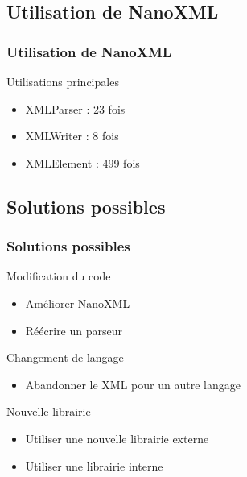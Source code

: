 \subsection{Utilisation de NanoXML}
\begin{frame}\frametitle{Utilisation de NanoXML}
\begin{beamerboxesrounded}[shadow=true]{Utilisations principales}
 \begin{itemize}
  \item XMLParser : 23 fois
  \item XMLWriter : 8 fois
  \item XMLElement : 499 fois
 \end{itemize}
\end{beamerboxesrounded}
\end{frame}
\subsection{Solutions possibles}
\begin{frame}\frametitle{Solutions possibles}
\begin{minipage}[c]{.46\linewidth}
\begin{beamerboxesrounded}[shadow=true]{Modification du code}
\begin{itemize}
	\item Améliorer NanoXML
	\item Réécrire un parseur
\end{itemize}
\end{beamerboxesrounded}
\end{minipage}
\hfill
\begin{minipage}[c]{.46\linewidth}
\begin{beamerboxesrounded}[shadow=true]{Changement de langage}
\begin{itemize}
	\item Abandonner le XML pour un autre langage
\end{itemize}
\end{beamerboxesrounded}
\end{minipage}
\vfill
\hfil
\begin{minipage}[c]{.8\linewidth}
\begin{beamerboxesrounded}[shadow=true]{Nouvelle librairie}
\begin{itemize}
	\item Utiliser une nouvelle librairie externe
	\item Utiliser une librairie interne
\end{itemize}
\end{beamerboxesrounded}
\end{minipage}
\end{frame}
